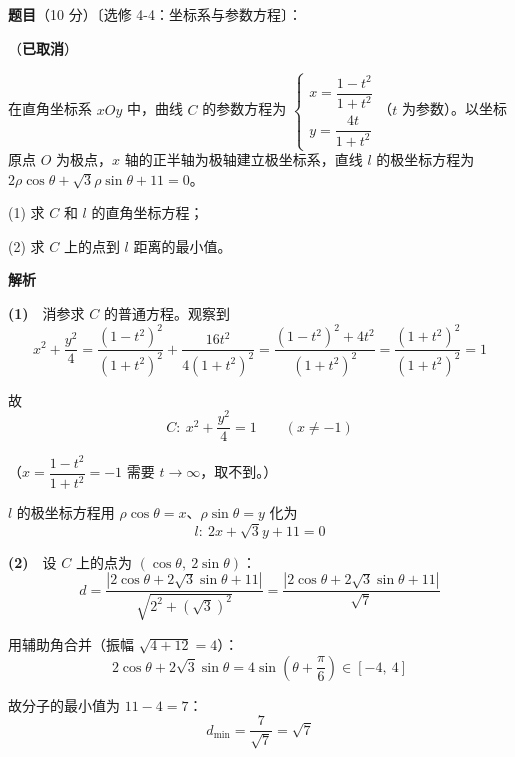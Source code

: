 \begin{answer}

\textbf{题目}（10 分）〔选修 4-4：坐标系与参数方程〕：

（\textbf{已取消}）

在直角坐标系 $xOy$ 中，曲线 $C$ 的参数方程为 $\begin{cases}x=\dfrac{1-t^{2}}{1+t^{2}}\\[2mm] y=\dfrac{4t}{1+t^{2}}\end{cases}$（$t$ 为参数）。以坐标原点 $O$ 为极点，$x$ 轴的正半轴为极轴建立极坐标系，直线 $l$ 的极坐标方程为 $2\rho\cos\theta+\sqrt3\rho\sin\theta+11=0$。

  (1) 求 $C$ 和 $l$ 的直角坐标方程；

  (2) 求 $C$ 上的点到 $l$ 距离的最小值。

\textbf{解析}

\textbf{(1)}　消参求 $C$ 的普通方程。观察到
\nopagebreak[4]
\[x^{2}+\frac{y^{2}}4=\frac{\left(1-t^{2}\right)^{2}}{\left(1+t^{2}\right)^{2}}+\frac{16t^{2}}{4\left(1+t^{2}\right)^{2}}=\frac{\left(1-t^{2}\right)^{2}+4t^{2}}{\left(1+t^{2}\right)^{2}}=\frac{\left(1+t^{2}\right)^{2}}{\left(1+t^{2}\right)^{2}}=1\]

故
\nopagebreak[4]
\[C:\ x^{2}+\frac{y^{2}}4=1\qquad(x\ne-1)\]

（$x=\dfrac{1-t^{2}}{1+t^{2}}=-1$ 需要 $t\to\infty$，取不到。）

$l$ 的极坐标方程用 $\rho\cos\theta=x$、$\rho\sin\theta=y$ 化为
\nopagebreak[4]
\[l:\ 2x+\sqrt3y+11=0\]

\textbf{(2)}　设 $C$ 上的点为 $(\cos\theta,\ 2\sin\theta)$：
\nopagebreak[4]
\[d=\frac{\left|2\cos\theta+2\sqrt3\sin\theta+11\right|}{\sqrt{2^{2}+\left(\sqrt3\right)^{2}}}=\frac{\left|2\cos\theta+2\sqrt3\sin\theta+11\right|}{\sqrt7}\]

用辅助角合并（振幅 $\sqrt{4+12}=4$）：
\nopagebreak[4]
\[2\cos\theta+2\sqrt3\sin\theta=4\sin\left(\theta+\frac\pi6\right)\in[-4,\ 4]\]

故分子的最小值为 $11-4=7$：
\nopagebreak[4]
\[d_{\min}=\frac7{\sqrt7}=\sqrt7\]



\par\medskip

\end{answer}
